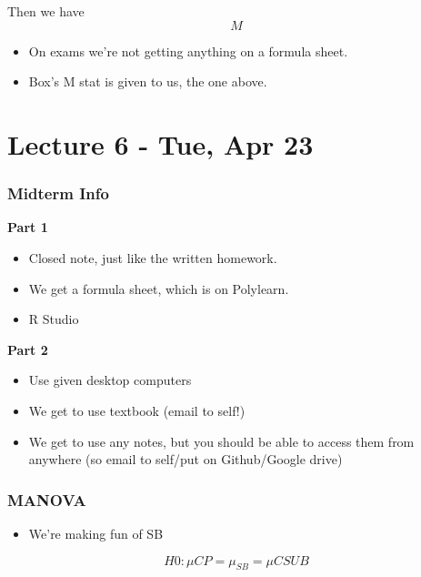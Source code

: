 \documentclass[]{article}
\providecommand{\tightlist}{%
  \setlength{\itemsep}{0pt}\setlength{\parskip}{0pt}}
\begin{document}
Then we have \[M\]

\begin{itemize}
\tightlist
\item
  On exams we're not getting anything on a formula sheet.
\item
  Box's M stat is given to us, the one above.
\end{itemize}

\hypertarget{lecture-6---tue-apr-23}{%
\section{Lecture 6 - Tue, Apr 23}\label{lecture-6---tue-apr-23}}

\hypertarget{midterm-info}{%
\subsubsection{Midterm Info}\label{midterm-info}}

\textbf{Part 1}

\begin{itemize}
\tightlist
\item
  Closed note, just like the written homework.
\item
  We get a formula sheet, which is on Polylearn.
\item
  R Studio
\end{itemize}

\textbf{Part 2}

\begin{itemize}
\tightlist
\item
  Use given desktop computers
\item
  We get to use textbook (email to self!)
\item
  We get to use any notes, but you should be able to access them from
  anywhere (so email to self/put on Github/Google drive)
\end{itemize}

\hypertarget{manova}{%
\subsubsection{MANOVA}\label{manova}}

\begin{itemize}
\tightlist
\item
  We're making fun of SB
\end{itemize}

\[H0: \mu{CP} = \mu_{SB} = \mu{CSU B} \]
\end{document}
